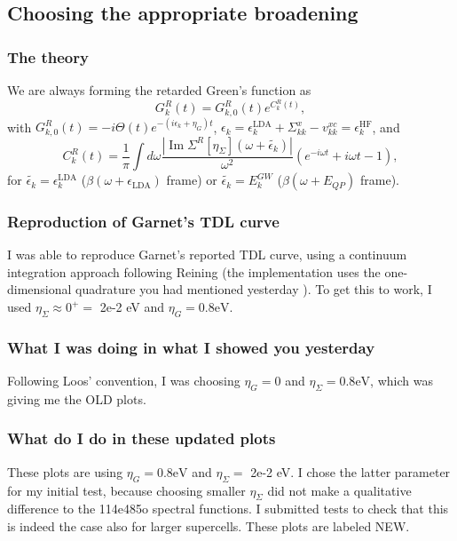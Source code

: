 \subsection{Choosing the appropriate broadening }
\subsubsection{The theory}
We are always forming the retarded Green's function as 
\begin{equation}
    G^R_k(t) = G_{k,0}^R(t) e^{C_k^R(t)},
\end{equation}
with
$G_{k,0}^R(t) = -i \Theta(t) e^{-(i\epsilon_k +\eta_G )t}$, $\epsilon_k=\epsilon_k^{\mathrm{LDA}}+\Sigma_{kk}^{x}-v_{kk}^{xc}=\epsilon_k^{\mathrm{HF}}$, and
\begin{equation}
    C_k^R(t) = \frac{1}{\pi}\int d\omega \frac{|\operatorname{Im} \Sigma^R[\eta_{\Sigma}](\omega+\tilde{\epsilon_k})|}{\omega^2} \left( e^{-i\omega t} + i\omega t - 1 \right),
\end{equation}
for $\tilde{\epsilon_k} = \epsilon_k^{\mathrm{LDA}}$ ($\beta(\omega+\epsilon_{\mathrm{LDA}})$ frame) or $\tilde{\epsilon_k} = E_k^{GW}$ ($\beta(\omega+E_{QP})$ frame).
\subsubsection{Reproduction of Garnet's TDL curve}
I was able to reproduce Garnet's reported TDL curve, using a continuum integration approach following Reining (the implementation uses the one-dimensional quadrature you had mentioned yesterday ). To get this to work, I used $\eta_{\Sigma} \approx 0^+ =$ 2e-2 eV and $\eta_G = 0.8 \text{eV}$.
\subsubsection{What I was doing in what I showed you yesterday  }
Following Loos' convention, I was choosing $\eta_G = 0$ and $\eta_{\Sigma} = 0.8 \text{eV}$, which was giving me the OLD plots.
\subsubsection{What do I do in these updated plots}
These plots are using $\eta_G = 0.8 \text{eV}$ and $\eta_{\Sigma} =$ 2e-2 eV. I chose the latter parameter for my initial test, because choosing smaller $\eta_{\Sigma}$ did not make a qualitative difference to the 114e485o spectral functions. I submitted tests to check that this is indeed the case also for larger supercells. These plots are labeled NEW.
